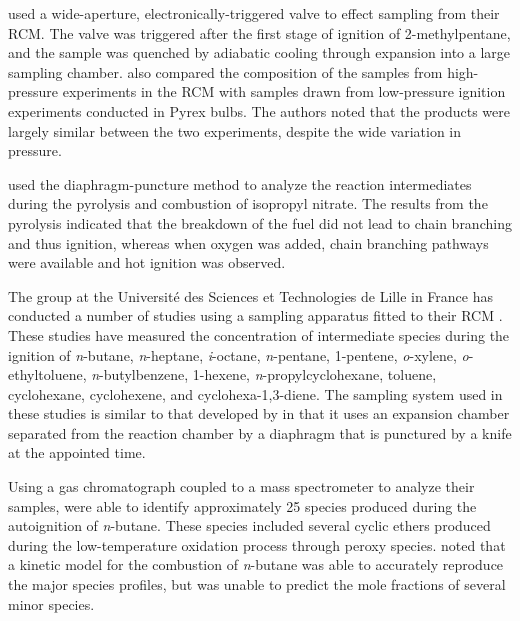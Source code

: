 \documentclass[../main.tex]{subfiles}
\begin{document}
\textcite{Affleck1967} used a wide-aperture, electronically-triggered valve
to effect sampling from their RCM. The valve was triggered after the first
stage of ignition of 2-methylpentane, and the sample was quenched by
adiabatic cooling through expansion into a large sampling chamber.
\textcite{Affleck1967} also compared the composition of the samples from
high-pressure experiments in the RCM with samples drawn from low-pressure
ignition experiments conducted in Pyrex bulbs. The authors noted that
the products were largely similar between the two experiments, despite the
wide variation in pressure.

\textcite{Beeley1980} used the diaphragm-puncture method to analyze the
reaction intermediates during the pyrolysis and combustion of isopropyl
nitrate. The results from the pyrolysis indicated that the breakdown
of the fuel did not lead to chain branching and thus ignition, whereas
when oxygen was added, chain branching pathways were available and hot
ignition was observed.

The group at the Université des Sciences et Technologies de Lille in France
has conducted a number of studies using a sampling apparatus fitted to
their RCM \cite{Ribaucour1992,Minetti1994, Minetti1995, Minetti1996, Ribaucour1998,
Minetti1999, Ribaucour2000a, Roubaud2000a, Lemaire2001, Ribaucour2002,
Vanhove2006a, Vanhove2006, Crochet2010}. These studies have measured the
concentration of intermediate species during the ignition of \textit{n}-butane,
\textit{n}-heptane, \textit{i}-octane, \textit{n}-pentane, 1-pentene,
\textit{o}-xylene, \textit{o}-ethyltoluene, \textit{n}-butylbenzene,
1-hexene, \textit{n}-propylcyclohexane, toluene, cyclohexane, cyclohexene,
and cyclohexa-1,3-diene. The sampling system used in these studies
is similar to that developed by \textcite{Roblee1961} in that it uses an
expansion chamber separated from the reaction chamber by a diaphragm
that is punctured by a knife at the appointed time.

Using a gas chromatograph coupled to a mass spectrometer to analyze their
samples, \textcite{Minetti1994} were able to identify approximately 25
species produced during the autoignition of \textit{n}-butane. These
species included several cyclic ethers produced during the low-temperature
oxidation process through peroxy species. \textcite{Minetti1994} noted
that a kinetic model for the combustion of \textit{n}-butane was able
to accurately reproduce the major species profiles, but was unable to
predict the mole fractions of several minor species.
\end{document}
